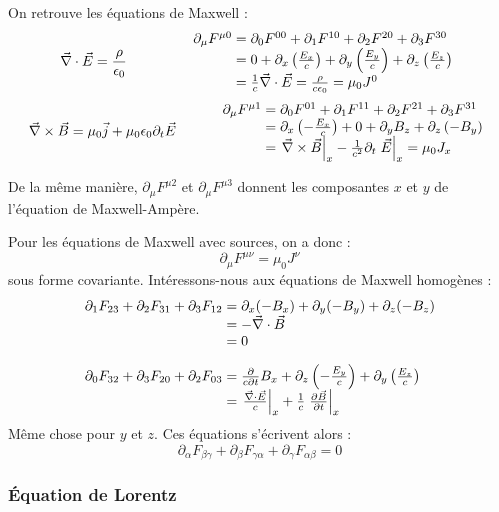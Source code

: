 On retrouve les équations de Maxwell :
$$
	\nab\cdot\vec{E}=\frac{\rho}{\epsilon_0} \text{\hspace{1.5cm}}
	\begin{array}{r@{\;}l}
		\partial_\mu F^{\mu 0}&=\partial_0F^{00}+\partial_1F^{10}+\partial_2F^{20}+\partial_3F^{30}\\
		&=0+\partial_x\left(\frac{E_x}{c}\right)+\partial_y\left(\frac{E_y}{c}\right)+\partial_z\left(\frac{E_z}{c}\right)\\
		&=\frac{1}{c}\nab\cdot\vec{E}=\frac{\rho}{c\epsilon_0}=\mu_0J^0
	\end{array}
$$
$$
	\nab\times\vec{B}=\mu_0\vec{j}+\mu_0\epsilon_0\partial_t\vec{E} \text{\hspace{1cm}}
	\begin{array}{r@{\;}l}
		\partial_\mu F^{\mu 1}&=\partial_0F^{01}+\partial_1F^{11}+\partial_2F^{21}+\partial_3F^{31}\\
		&=\partial_x\left(-\frac{E_x}{c}\right)+0+\partial_yB_z+\partial_z\left(-B_y\right)\\
		&=\left.\nab\times\vec{B}\right|_x-\frac{1}{c^2}\partial_t\left.\vec{E}\right|_x=\mu_0J_x
	\end{array}
$$

De la m\^eme manière, $\partial_\mu F^{\mu 2}$ et $\partial_\mu F^{\mu 3}$ donnent les composantes $x$ et $y$ de l'équation de Maxwell-Ampère.

Pour les équations de Maxwell avec sources, on a donc :
$$
	\boxed{\partial_\mu F^{\mu\nu}=\mu_0J^\nu}
$$
sous forme covariante. Intéressons-nous aux équations de Maxwell homogènes :
$$
	\begin{array}{r@{\;}l}
		\partial_1F_{23}+\partial_2F_{31}+\partial_3F_{12}&=\partial_x(-B_x)+\partial_y(-B_y)+\partial_z(-B_z)\\
			&= -\nab\cdot\vec{B}\\
			&= 0 \\[10pt]
		\partial_0F_{32}+\partial_3F_{20}+\partial_2F_{03}&=\frac{\partial}{c\partial t}B_x+\partial_z\left(-\frac{E_y}{c}\right)+\partial_y\left(\frac{E_z}{c}\right)\\
			&=\left.\frac{\nab\cdot\vec{E}}{c}\right|_x+\frac{1}{c}\left.\frac{\partial \vec{B}}{\partial t}\right|_x
	\end{array}
$$
M\^eme chose pour $y$ et $z$. Ces équations s'écrivent alors :
$$
	\boxed{\partial_\alpha F_{\beta\gamma} + \partial_\beta F_{\gamma\alpha} + \partial_\gamma F_{\alpha\beta} = 0}
$$

\subsubsection*{Équation de Lorentz}

